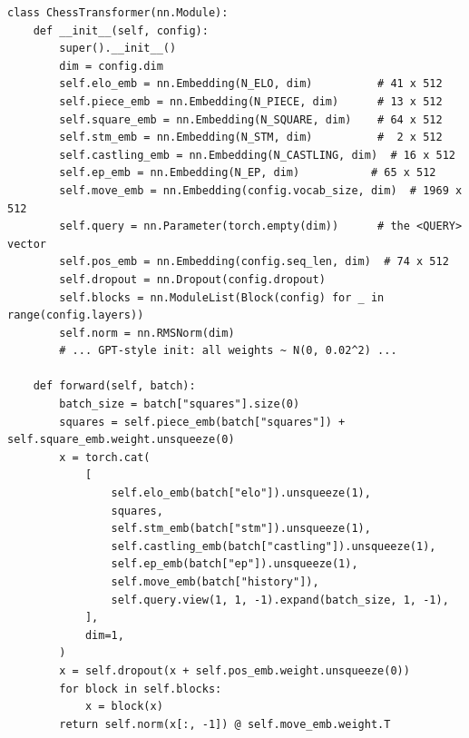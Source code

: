\documentclass[10pt,a4paper]{article}
\newcommand{\code}[1]{\texttt{#1}}
\begin{document}
\begin{lstlisting}[style=code, caption={The full model
(\code{model.py}, lightly trimmed). The output layer is \emph{no new
parameters at all}: the final hidden state of the \code{<QUERY>} token is
projected through the transposed move-embedding table --- the tied
readout.}, label={lst:model}, float=htbp]
class ChessTransformer(nn.Module):
    def __init__(self, config):
        super().__init__()
        dim = config.dim
        self.elo_emb = nn.Embedding(N_ELO, dim)          # 41 x 512
        self.piece_emb = nn.Embedding(N_PIECE, dim)      # 13 x 512
        self.square_emb = nn.Embedding(N_SQUARE, dim)    # 64 x 512
        self.stm_emb = nn.Embedding(N_STM, dim)          #  2 x 512
        self.castling_emb = nn.Embedding(N_CASTLING, dim)  # 16 x 512
        self.ep_emb = nn.Embedding(N_EP, dim)           # 65 x 512
        self.move_emb = nn.Embedding(config.vocab_size, dim)  # 1969 x 512
        self.query = nn.Parameter(torch.empty(dim))      # the <QUERY> vector
        self.pos_emb = nn.Embedding(config.seq_len, dim)  # 74 x 512
        self.dropout = nn.Dropout(config.dropout)
        self.blocks = nn.ModuleList(Block(config) for _ in range(config.layers))
        self.norm = nn.RMSNorm(dim)
        # ... GPT-style init: all weights ~ N(0, 0.02^2) ...

    def forward(self, batch):
        batch_size = batch["squares"].size(0)
        squares = self.piece_emb(batch["squares"]) + self.square_emb.weight.unsqueeze(0)
        x = torch.cat(
            [
                self.elo_emb(batch["elo"]).unsqueeze(1),
                squares,
                self.stm_emb(batch["stm"]).unsqueeze(1),
                self.castling_emb(batch["castling"]).unsqueeze(1),
                self.ep_emb(batch["ep"]).unsqueeze(1),
                self.move_emb(batch["history"]),
                self.query.view(1, 1, -1).expand(batch_size, 1, -1),
            ],
            dim=1,
        )
        x = self.dropout(x + self.pos_emb.weight.unsqueeze(0))
        for block in self.blocks:
            x = block(x)
        return self.norm(x[:, -1]) @ self.move_emb.weight.T
\end{lstlisting}
\end{document}
